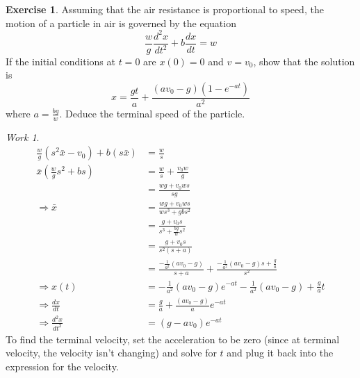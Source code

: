 \documentclass{report}
\theoremstyle{definition}
\newtheorem{exercise}{Exercise}[chapter]
\theoremstyle{remark}
\newtheorem*{work}{Work}
\newcommand{\od}[2]{\frac{d #1}{d#2}}
\newcommand{\odt}[2]{\frac{d^2 #1}{d#2^2}}
\begin{document}
\begin{exercise}
    Assuming that the air resistance is proportional to speed, the motion of a particle in air is governed by the equation 
    \begin{equation*}
        \frac{w}{g} \odt{x}{t} + b\od{x}{t} = w
    \end{equation*}
    If the initial conditions at $t=0$ are $x(0)=0$ and $v=v_0$, show that the solution is 
    \begin{equation*}
        x=\frac{gt}{a} +\frac{(av_0-g)(1-e^{-at})}{a^2}
    \end{equation*}
    where $a=\frac{bg}{w}$. Deduce the terminal speed of the particle.
\end{exercise}
\begin{work}
    \begin{equation*}
        \begin{split}
            \frac{w}{g}(s^2\bar x-v_0)+b(s\bar x)&=\frac{w}{s}\\
            \bar x\left( \frac{w}{g}s^2+bs\right) &=\frac{w}{s}+\frac{v_0w}{g}\\
            &=\frac{wg+v_0ws}{sg}\\
            \Rightarrow \bar x&=\frac{wg+v_0ws}{ws^3+gbs^2}\\
            &=\frac{g+v_0s}{s^3+\frac{bg}{w}s^2}\\
            &=\frac{g+v_0s}{s^2(s+a)} \\
            &=\frac{-\frac{1}{a^2}(av_0-g)}{s+a}+\frac{-\frac{1}{a^2}(av_0-g)s+\frac{g}{a}}{s^2} \\
            \Rightarrow x(t) &= -\frac{1}{a^2}(av_0-g)e^{-at}-\frac{1}{a^2}(av_0-g)+\frac{g}{a}t \\
            \Rightarrow \od{x}{t} &= \frac{g}{a}+\frac{(av_0-g)}{a}e^{-at}\\
            \Rightarrow \odt{x}{t} &=(g-av_0)e^{-at}
        \end{split}
    \end{equation*}
    To find the terminal velocity, set the acceleration to be zero (since at terminal velocity, the velocity isn't changing) and solve for $t$ and plug it back into the expression for the velocity.
\end{work}
\end{document}
